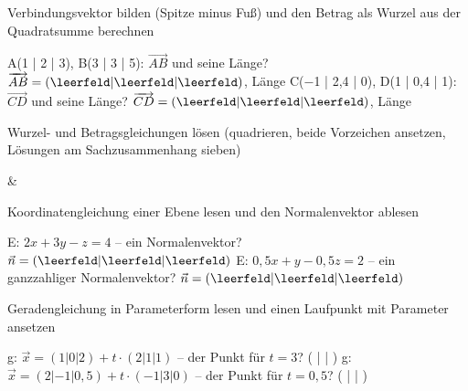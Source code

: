 \setcounter{aufgabe}{0}

\begin{aufgabe}{Verbindungsvektor bilden (Spitze minus Fuß) und den Betrag als Wurzel aus der Quadratsumme berechnen}
\begin{teile}
\teil A(1 | 2 | 3), B(3 | 3 | 5): $\overrightarrow{AB}$ und seine Länge? $\overrightarrow{AB} = ( \leerfeld | \leerfeld | \leerfeld )$, Länge \leerfeld
\teil C(−1 | 2,4 | 0), D(1 | 0,4 | 1): $\overrightarrow{CD}$ und seine Länge? $\overrightarrow{CD} = ( \leerfeld | \leerfeld | \leerfeld )$, Länge \leerfeld
\end{teile}
\end{aufgabe}

\begin{aufgabe}{Wurzel- und Betragsgleichungen lösen (quadrieren, beide Vorzeichen ansetzen, Lösungen am Sachzusammenhang sieben)}
\begin{gleichungsraster}[2]
 &
 \\
\end{gleichungsraster}
\end{aufgabe}

\begin{aufgabe}{Koordinatengleichung einer Ebene lesen und den Normalenvektor ablesen}
\begin{teile}
\teil E: $2x + 3y - z = 4$ – ein Normalenvektor? $\vec n = ( \leerfeld | \leerfeld | \leerfeld )$
\teil E: $0{,}5x + y - 0{,}5z = 2$ – ein ganzzahliger Normalenvektor? $\vec n = ( \leerfeld | \leerfeld | \leerfeld )$
\end{teile}
\end{aufgabe}

\begin{aufgabe}{Geradengleichung in Parameterform lesen und einen Laufpunkt mit Parameter ansetzen}
\begin{teile}
\teil g: $\vec x = (1 | 0 | 2) + t \cdot (2 | 1 | 1)$ – der Punkt für $t = 3$? ( \leerfeld | \leerfeld | \leerfeld )
\teil g: $\vec x = (2 | -1 | 0{,}5) + t \cdot (-1 | 3 | 0)$ – der Punkt für $t = 0{,}5$? ( \leerfeld | \leerfeld | \leerfeld )
\end{teile}
\end{aufgabe}

